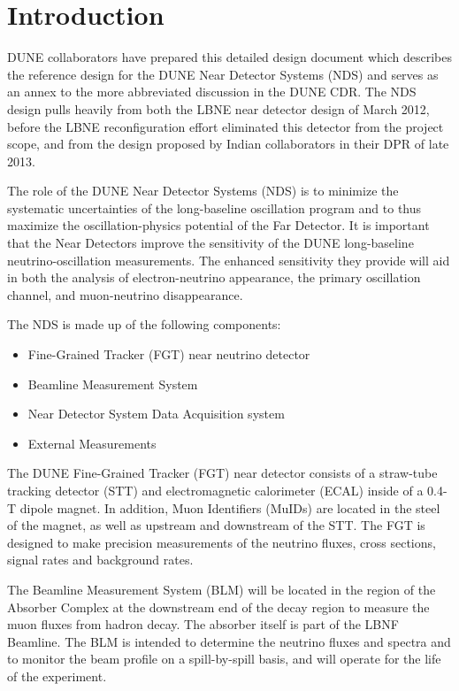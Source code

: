 \chapter{Introduction}  
\label{ch:nd-annex-intro}

DUNE collaborators have prepared this detailed design document which describes the reference design for 
the DUNE Near Detector Systems (NDS) and serves as an annex to the more abbreviated discussion in the DUNE 
CDR.  The NDS design pulls heavily from both the LBNE near detector design of March 2012, before the LBNE reconfiguration effort eliminated this detector from the project scope, and from the design proposed by Indian collaborators in their DPR of late 2013.

The role of the DUNE Near Detector Systems (NDS) is to 
minimize the systematic uncertainties of 
the long-baseline oscillation program and to thus maximize the 
oscillation-physics potential of the Far Detector. It is important that the
 Near Detectors improve the sensitivity of the 
DUNE long-baseline neutrino-oscillation measurements. 
The enhanced sensitivity they provide will aid in both the analysis of electron-neutrino 
appearance, the primary oscillation channel, and muon-neutrino disappearance. 

The NDS is made up of the following components:

\begin{itemize}
\item Fine-Grained Tracker (FGT) near neutrino detector
\item Beamline Measurement System
\item Near Detector System Data Acquisition system
\item External Measurements
\end{itemize}

The DUNE Fine-Grained Tracker (FGT) near detector consists of a straw-tube
tracking detector (STT) and electromagnetic calorimeter (ECAL) inside of a 0.4-T
dipole magnet. In addition, Muon Identifiers (MuIDs) are located in the
steel of the magnet, as well as upstream and downstream of the STT. The FGT
is designed to make precision measurements of the neutrino fluxes, 
cross sections, signal rates and background rates. 

The Beamline Measurement System (BLM) will be located in the region of the Absorber Complex at 
the downstream end of the decay region to measure the muon fluxes from hadron decay. The 
absorber itself is part of the LBNF Beamline. 
The BLM is intended to determine the neutrino fluxes and spectra
and to monitor the beam profile on a spill-by-spill basis, and will operate for the life of the
experiment. 

